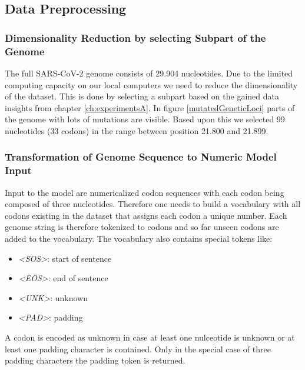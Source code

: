 \subsection{Data Preprocessing} \label{approachB}

\subsubsection{Dimensionality Reduction by selecting Subpart of the Genome} \label{approachBa}

The full \ac{SARS-CoV-2} genome consists of 29.904 nucleotides. Due to the limited computing capacity on our local computers we need to reduce the dimensionality of the dataset. This is done by selecting a subpart based on the gained data insights from chapter \ref{ch:experimentsA}. In figure \ref{mutatedGeneticLoci} parts of the genome with lots of mutations are visible. Based upon this we selected 99 nucleotides (33 codons) in the range between position 21.800 and 21.899.

\subsubsection{Transformation of Genome Sequence to Numeric Model Input} \label{approachBb}

Input to the model are numericalized codon sequences with each codon being composed of three nucleotides. Therefore one needs to build a vocabulary with all codons existing in the dataset that assigns each codon a unique number. Each genome string is therefore tokenized to codons and so far unseen codons are added to the vocabulary. The vocabulary also contains special tokens like:

\begin{itemize}
	\item \textit{<SOS>}: start of sentence
	\item \textit{<EOS>}: end of sentence
	\item \textit{<UNK>}: unknown
	\item \textit{<PAD>}: padding
\end{itemize}

A codon is encoded as unknown in case at least one nulceotide is unknown or at least one padding character is contained. Only in the special case of three padding characters the padding token is returned. 


